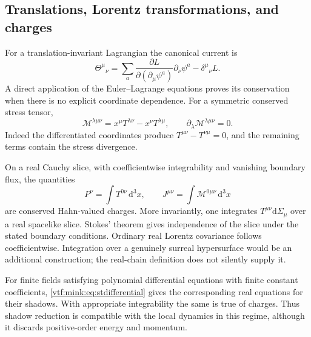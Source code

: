 \documentclass[11pt,letterpaper]{article}
\theoremstyle{definition}
\theoremstyle{remark}
\newcommand{\dd}{\mathrm d}
\begin{document}
\subsection{Translations, Lorentz transformations, and charges}
For a translation-invariant Lagrangian the canonical current is
\begin{equation}
 \Theta^\mu{}_{\nu}
 =\sum_a\frac{\partial L}{\partial(\partial_\mu\psi^a)}
          \partial_\nu\psi^a-\delta^\mu{}_{\nu}L.
\end{equation}
A direct application of the Euler--Lagrange equations proves its conservation when there is no explicit coordinate dependence. For a symmetric conserved stress tensor,
\begin{equation}\label{vtf:mink:eq:angularcurrent}
 \mathcal M^{\lambda\mu\nu}
 =x^\mu T^{\lambda\nu}-x^\nu T^{\lambda\mu},
 \qquad \partial_\lambda \mathcal M^{\lambda\mu\nu}=0.
\end{equation}
Indeed the differentiated coordinates produce $T^{\mu\nu}-T^{\nu\mu}=0$, and the remaining terms contain the stress divergence.

On a real Cauchy slice, with coefficientwise integrability and vanishing boundary flux, the quantities
\begin{equation}
 P^\nu=\int T^{0\nu}\,\dd^3x,
 \qquad J^{\mu\nu}=\int \mathcal M^{0\mu\nu}\,\dd^3x
\end{equation}
are conserved Hahn-valued charges. More invariantly, one integrates $T^{\mu\nu}\dd\Sigma_\mu$ over a real spacelike slice. Stokes' theorem gives independence of the slice under the stated boundary conditions. Ordinary real Lorentz covariance follows coefficientwise. Integration over a genuinely surreal hypersurface would be an additional construction; the real-chain definition does not silently supply it.

For finite fields satisfying polynomial differential equations with finite constant coefficients, \cref{vtf:mink:eq:stdifferential} gives the corresponding real equations for their shadows. With appropriate integrability the same is true of charges. Thus shadow reduction is compatible with the local dynamics in this regime, although it discards positive-order energy and momentum.
\end{document}
